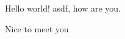 \documentclass{article}
\begin{document}
Hello world! asdf, how are you.

Nice to meet you
\end{document}
